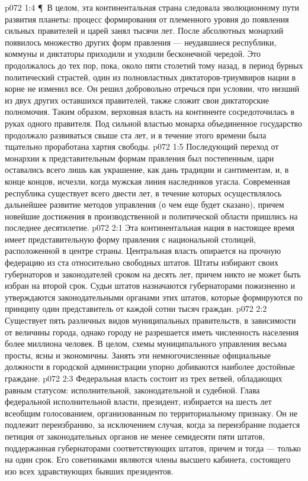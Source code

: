 \vs p072 1:4 \P\ В целом, эта континентальная страна следовала эволюционному пути развития планеты: процесс формирования от племенного уровня до появления сильных правителей и царей занял тысячи лет. После абсолютных монархий появилось множество других форм правления --- неудавшиеся республики, коммуны и диктаторы приходили и уходили бесконечной чередой. Это продолжалось до тех пор, пока, около пяти столетий тому назад, в период бурных политический страстей, один из полновластных диктаторов\hyp{}триумвиров нации в корне не изменил все. Он решил добровольно отречься при условии, что низший из двух других оставшихся правителей, также сложит свои диктаторские полномочия. Таким образом, верховная власть на континенте сосредоточилась в руках одного правителя. Под сильной властью монарха объединенное государство продолжало развиваться свыше ста лет, и в течение этого времени была тщательно проработана хартия свободы.
\vs p072 1:5 Последующий переход от монархии к представительным формам правления был постепенным, цари оставались всего лишь как украшение, как дань традиции и сантиментам, и, в конце концов, исчезли, когда мужская линия наследников угасла. Современная республика существует всего двести лет, в течение которых осуществлялось дальнейшее развитие методов управления (о чем еще будет сказано), причем новейшие достижения в производственной и политической области пришлись на последнее десятилетие.
\vs p072 2:1 Эта континентальная нация в настоящее время имеет представительную форму правления с национальной столицей, расположенной в центре страны. Центральная власть опирается на прочную федерацию из ста относительно свободных штатов. Штаты избирают своих губернаторов и законодателей сроком на десять лет, причем никто не может быть избран на второй срок. Судьи штатов назначаются губернаторами пожизненно и утверждаются законодательными органами этих штатов, которые формируются по принципу один представитель от каждой сотни тысяч граждан.
\vs p072 2:2 Существует пять различных видов муниципальных правительств, в зависимости от величины города, однако городу не разрешается иметь численность населения более миллиона человек. В целом, схемы муниципального управления весьма просты, ясны и экономичны. Занять эти немногочисленные официальные должности в городской администрации упорно добиваются наиболее достойные граждане.
\vs p072 2:3 Федеральная власть состоит из трех ветвей, обладающих равным статусом: исполнительной, законодательной и судебной. Глава федеральной исполнительной власти, президент, избирается на шесть лет всеобщим голосованием, организованным по территориальному признаку. Он не подлежит переизбранию, за исключением случая, когда за переизбрание подается петиция от законодательных органов не менее семидесяти пяти штатов, поддержанная губернаторами соответствующих штатов, причем и тогда --- только на один срок. Его советниками являются члены высшего кабинета, состоящего изо всех здравствующих бывших президентов.
